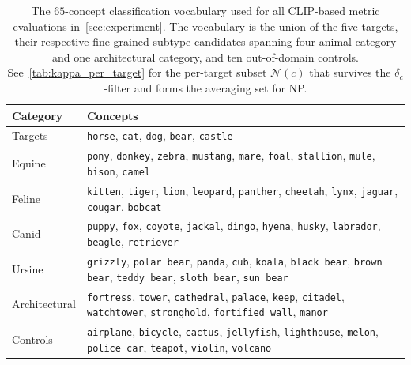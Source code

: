 \begin{table}[h]
\centering
\small
\begin{tabular}{p{3.2cm} p{10cm}}
\toprule
Category & Concepts \\
\midrule
Targets & \texttt{horse}, \texttt{cat}, \texttt{dog}, \texttt{bear}, \texttt{castle} \\
Equine  & \texttt{pony}, \texttt{donkey}, \texttt{zebra}, \texttt{mustang}, \texttt{mare}, \texttt{foal}, \texttt{stallion}, \texttt{mule}, \texttt{bison}, \texttt{camel} \\
Feline  & \texttt{kitten}, \texttt{tiger}, \texttt{lion}, \texttt{leopard}, \texttt{panther}, \texttt{cheetah}, \texttt{lynx}, \texttt{jaguar}, \texttt{cougar}, \texttt{bobcat} \\
Canid  & \texttt{puppy}, \texttt{fox}, \texttt{coyote}, \texttt{jackal}, \texttt{dingo}, \texttt{hyena}, \texttt{husky}, \texttt{labrador}, \texttt{beagle}, \texttt{retriever} \\
Ursine & \texttt{grizzly}, \texttt{polar bear}, \texttt{panda}, \texttt{cub}, \texttt{koala}, \texttt{black bear}, \texttt{brown bear}, \texttt{teddy bear}, \texttt{sloth bear}, \texttt{sun bear} \\
Architectural  & \texttt{fortress}, \texttt{tower}, \texttt{cathedral}, \texttt{palace}, \texttt{keep}, \texttt{citadel}, \texttt{watchtower}, \texttt{stronghold}, \texttt{fortified wall}, \texttt{manor} \\
Controls  & \texttt{airplane}, \texttt{bicycle}, \texttt{cactus}, \texttt{jellyfish}, \texttt{lighthouse}, \texttt{melon}, \texttt{police car}, \texttt{teapot}, \texttt{violin}, \texttt{volcano} \\
\bottomrule
\end{tabular}
\caption{The $65$-concept classification vocabulary used for all CLIP-based metric evaluations in~\cref{sec:experiment}. The vocabulary is the union of the five targets, their respective fine-grained subtype candidates spanning four animal category and one architectural category, and ten out-of-domain controls. See~\cref{tab:kappa_per_target} for the per-target subset $\mathcal{N}(c)$ that survives the $\delta_{c}$-filter and forms the averaging set for NP.}
\label{tab:vocab}
\end{table}

